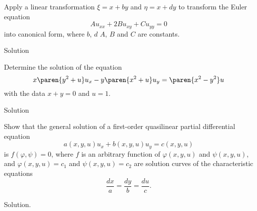 \documentclass[11pt]{penrose}
\begin{document}
\begin{problem}{2}
    Apply a linear transformation $\xi = x+by$ and $\eta = x+dy$ to transform the Euler equation
    \begin{equation*}
        A u_{xx} + 2B u_{xy} + C u_{yy} = 0
    \end{equation*}
    into canonical form, where $b$, $d$ $A$, $B$ and $C$ are constants.

    \solution Solution
\end{problem}

\begin{problem}{3}
    Determine the solution of the equation
    \begin{equation*}
        x \paren{y^2 + u} u_x - y \paren{x^2 + u} u_y = \paren{x^2 - y^2} u
    \end{equation*}
    with the data $x + y = 0$ and $u = 1$.

    \solution Solution
\end{problem}

\begin{problem}{4}
    Show that the general solution of a first-order quasilinear partial differential equation
    \begin{equation*}
        a(x,y,u) u_x + b(x,y,u) u_y = c(x,y,u)
    \end{equation*}
    is $f(\varphi, \psi) = 0$, where $f$ is an arbitrary function of $\varphi(x,y,u)$ and $\psi(x,y,u)$, and $\varphi(x,y,u) = c_1$ and $\psi(x,y,u) = c_2$ are solution curves of the characteristic equations
    \begin{equation*}
        \frac{dx}{a} = \frac{dy}{b} = \frac{du}{c}.
    \end{equation*}

    \solution Solution.
\end{problem}
\end{document}
